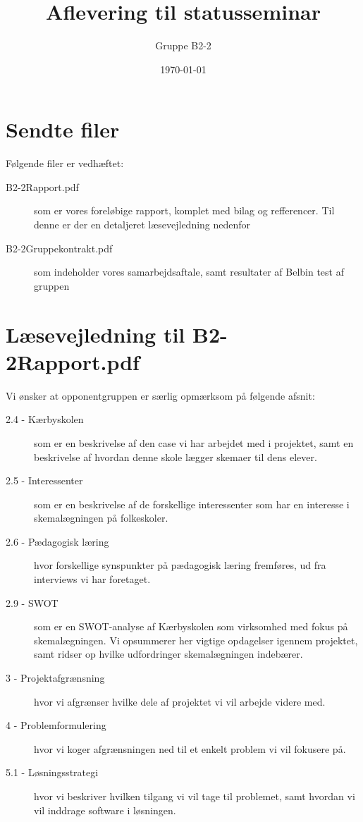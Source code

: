\documentclass{article}
\begin{document}
\title{Aflevering til statusseminar}
\author{Gruppe B2-2}
\date{\today}
\maketitle

\section*{Sendte filer}
Følgende filer er vedhæftet:
\begin{description}
	\item[B2-2\textunderscore Rapport.pdf] som er vores foreløbige rapport, komplet med bilag og refferencer. Til denne er der en detaljeret læsevejledning nedenfor
	\item[B2-2\textunderscore Gruppekontrakt.pdf] som indeholder vores samarbejdsaftale, samt resultater af Belbin test af gruppen
\end{description}

\section*{Læsevejledning til B2-2\textunderscore Rapport.pdf}
Vi ønsker at opponentgruppen er særlig opmærksom på følgende afsnit:
\begin{description}
	\item[2.4 - Kærbyskolen] som er en beskrivelse af den case vi har arbejdet med i projektet, samt en beskrivelse af hvordan denne skole lægger skemaer til dens elever.
	\item[2.5 - Interessenter] som er en beskrivelse af de forskellige interessenter som har en interesse i skemalægningen på folkeskoler.
	\item[2.6 - Pædagogisk læring] hvor forskellige synspunkter på pædagogisk læring fremføres, ud fra interviews vi har foretaget.
	\item[2.9 - SWOT] som er en SWOT-analyse af Kærbyskolen som virksomhed med fokus på skemalægningen. Vi opsummerer her vigtige opdagelser igennem projektet, samt ridser op hvilke udfordringer skemalægningen indebærer.
	\item[3 - Projektafgrænsning] hvor vi afgrænser hvilke dele af projektet vi vil arbejde videre med.
	\item[4 - Problemformulering] hvor vi koger afgrænsningen ned til et enkelt problem vi vil fokusere på.
	\item[5.1 - Løsningsstrategi] hvor vi beskriver hvilken tilgang vi vil tage til problemet, samt hvordan vi vil inddrage software i løsningen.
\end{description} 
\end{document}
